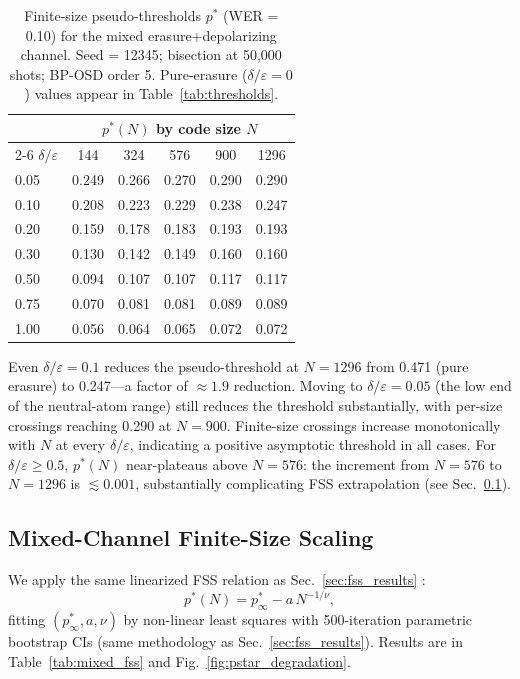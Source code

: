 \documentclass[a4paper]{quantumarticle}
\begin{document}
\begin{table}[h]
\centering
\caption{Finite-size pseudo-thresholds $p^*$ (WER = 0.10) for the mixed
erasure+depolarizing channel.
Seed = 12345; bisection at 50{,}000 shots; BP-OSD order 5.
Pure-erasure ($\delta/\varepsilon = 0$) values appear in Table~\ref{tab:thresholds}.}
\label{tab:mixed_thresholds}
\small
\begin{tabular}{lccccc}
\toprule
& \multicolumn{5}{c}{$p^*(N)$ by code size $N$} \\
\cmidrule(lr){2-6}
$\delta/\varepsilon$ & 144 & 324 & 576 & 900 & 1296 \\
\midrule
0.05 & 0.249 & 0.266 & 0.270 & 0.290 & 0.290 \\
0.10 & 0.208 & 0.223 & 0.229 & 0.238 & 0.247 \\
0.20 & 0.159 & 0.178 & 0.183 & 0.193 & 0.193 \\
0.30 & 0.130 & 0.142 & 0.149 & 0.160 & 0.160 \\
0.50 & 0.094 & 0.107 & 0.107 & 0.117 & 0.117 \\
0.75 & 0.070 & 0.081 & 0.081 & 0.089 & 0.089 \\
1.00 & 0.056 & 0.064 & 0.065 & 0.072 & 0.072 \\
\bottomrule
\end{tabular}
\end{table}

Even $\delta/\varepsilon = 0.1$ reduces the pseudo-threshold at $N = 1296$ from 0.471
(pure erasure) to 0.247---a factor of $\approx 1.9$ reduction.
Moving to $\delta/\varepsilon = 0.05$ (the low end of the neutral-atom range) still reduces
the threshold substantially, with per-size crossings reaching 0.290 at $N = 900$.
Finite-size crossings increase monotonically with $N$ at every $\delta/\varepsilon$,
indicating a positive asymptotic threshold in all cases.
For $\delta/\varepsilon \geq 0.5$, $p^*(N)$ near-plateaus above $N = 576$: the increment
from $N = 576$ to $N = 1296$ is $\lesssim 0.001$, substantially complicating FSS
extrapolation (see Sec.~\ref{sec:mixed_fss}).

\subsection{Mixed-Channel Finite-Size Scaling}\label{sec:mixed_fss}

We apply the same linearized FSS relation as Sec.~\ref{sec:fss_results}
\cite{dennis2002topological, bravyi2024high}:
\begin{equation}
    p^*(N) = p^*_\infty - a\,N^{-1/\nu},
    \label{eq:fss_mixed}
\end{equation}
fitting $(p^*_\infty, a, \nu)$ by non-linear least squares with 500-iteration parametric
bootstrap CIs (same methodology as Sec.~\ref{sec:fss_results}).
Results are in Table~\ref{tab:mixed_fss} and Fig.~\ref{fig:pstar_degradation}.
\end{document}
